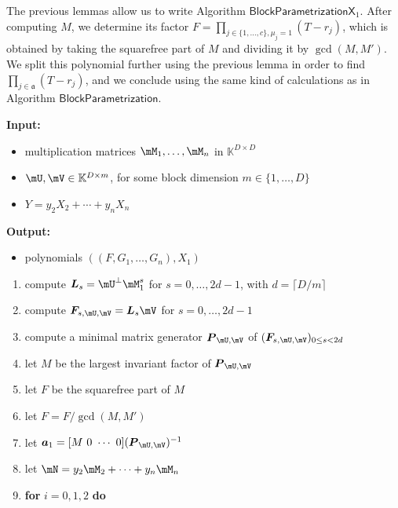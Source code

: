 \documentclass[12pt]{article}
\newcommand{\mat}[1]{\bm{\MakeUppercase{#1}}} %
\newcommand{\row}[1]{\bm{\MakeLowercase{#1}}} %
\newcommand{\seqelt}[1]{\bm{F}_{#1}} %
\newcommand{\mainalgoname}{\mathsf{ BlockParametrization}}
\newcommand{\mf}{Y}
\def\K{\mathbb{K}}
\def\K {\ensuremath{\mathbb{K}}}
\begin{document}
The previous lemmas allow us to write Algorithm
$\mathsf{BlockParametrizationX}_1$. After computing $M$, we determine its
factor $F=\prod_{j \in \{1,\dots,c\}, \mu_j=1} (T-r_j)$, which is
obtained by taking the squarefree part of $M$ and dividing it by
$\gcd(M,M')$. We split this polynomial further using the previous
lemma in order to find $\prod_{j \in \mathfrak{a}} (T-r_j)$, and we
conclude using the same kind of calculations as in Algorithm
$\mainalgoname$.

\begin{algorithm}[H]
	\caption{$\mainalgoname{\sf X}_1(\mM_1,\dots,\mM_n,\mU,\mV,\mf$)}
	{\bf Input:} \vspace{-0.5em}
	\begin{itemize}
		\item multiplication matrices $\mM_1,\dots,\mM_n$ in $\K^{D \times D}$
		\item  $\mU,\mV \in \mathbb{K}^{D \times m}$, for some block dimension  $m \in \{1,\dots,D\}$
                \item $\mf =y_2 X_2 + \cdots + y_n X_n$
	\end{itemize}
	{\bf Output:}  \vspace{-0.5em}
        \begin{itemize}
        \item polynomials $((F,G_1,\dots,G_n),X_1)$
        \end{itemize}
  \begin{enumerate}
  \item\label{X1step3} { compute $\mat{L}_s = \mU^{\perp}\mM_1^s$ for $s=0,\dots,2d-1$, with $d = \lceil D/m \rceil$}
  \item\label{X1step4} { compute $\seqelt{s,\mU,\mV}= \mat{L}_s\mV$ for $s=0,\dots, 2d-1$}
  \item\label{X1step5} { compute a minimal matrix generator $\mat{P}_{\mU,\mV}$ of $(\seqelt{s,\mU,\mV})_{0 \le s < 2d}$}
  \item\label{X1step6} { let $M$ be the largest invariant factor of $\mat{P}_{\mU,\mV}$}
  \item\label{X1step7} { let $F$ be  the squarefree part  of $M$}
  \item\label{X1step7b} let $F = F /\gcd(M, M')$
  \item\label{X1step8} { let $\row{a}_1 = [M~0 ~\cdots~ 0] (\mat{P}_{\mU,\mV})^{-1}$}
  \item let $\mN = y_2 \mM_2 + \cdots+y_n \mM_n$
  \item \textbf{for} $i=0,1,2$ \textbf{do}
    \begin{enumerate}

\end{enumerate}
\end{enumerate}
\end{algorithm}
\end{document}

